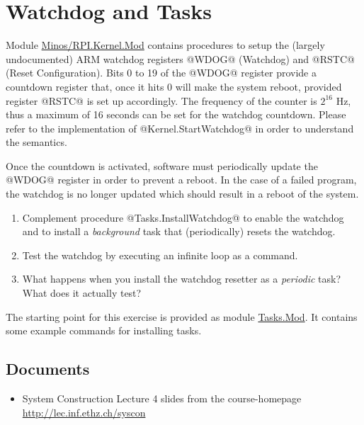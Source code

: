 \documentclass[10pt, a4]{article}
\begin{document}
\section{Watchdog and Tasks}
Module
\href{https://svn.inf.ethz.ch/svn/lecturers/vorlesungen/trunk/syscon/2019/shared/assignments/assignment4/Minos/RPI.Kernel.Mod}{Minos/RPI.Kernel.Mod}
contains procedures to setup the (largely undocumented) ARM watchdog registers @WDOG@ (Watchdog) and @RSTC@ (Reset Configuration). Bits 0 to 19 of the @WDOG@ register provide a countdown register that, once it hits 0 will make the system reboot, provided register @RSTC@ is set up accordingly. The frequency of the counter is $2^{16}$ Hz, thus a maximum of 16 seconds can be set for the watchdog countdown. Please refer to the implementation of @Kernel.StartWatchdog@ in order to understand the semantics.

Once the countdown is activated, software must periodically update the @WDOG@ register in order to prevent a reboot. In the case of a failed program, the watchdog is no longer updated which should result in a reboot of the system.
\begin{enumerate}
\item Complement procedure @Tasks.InstallWatchdog@ to enable the watchdog and to install a {\em background} task that (periodically) resets the watchdog.
\item Test the watchdog by executing an infinite loop as a command.
\item What happens when you install the watchdog resetter as a {\em periodic} task? What does it actually test?
\end{enumerate}
The starting point for this exercise is provided as module \href{https://svn.inf.ethz.ch/svn/lecturers/vorlesungen/trunk/syscon/2019/shared/assignments/assignment4/Tasks.Mod}{Tasks.Mod}. It contains some example commands for installing tasks.

\subsection*{Documents}
\begin{itemize}
\item System Construction Lecture 4 slides from the course-homepage \\ \url{http://lec.inf.ethz.ch/syscon}
\end{itemize}
\end{document}
